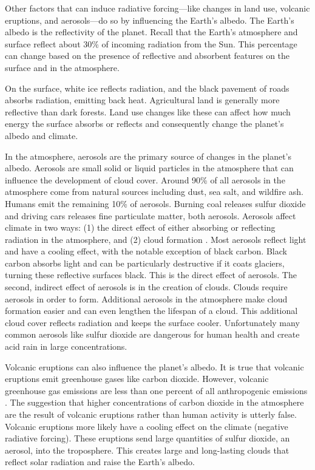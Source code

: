 Other factors that can induce radiative forcing---like changes in land use, volcanic eruptions, and aerosols---do so by influencing the Earth's albedo. The Earth's albedo is the reflectivity of the planet. Recall that the Earth's atmosphere and surface reflect about 30\% of incoming radiation from the Sun. This percentage can change based on the presence of reflective and absorbent features on the surface and in the atmosphere. 

On the surface, white ice reflects radiation, and the black pavement of roads absorbs radiation, emitting back heat. Agricultural land is generally more reflective than dark forests. Land use changes like these can affect how much energy the surface absorbs or reflects and consequently change the planet's albedo and climate. 

In the atmosphere, aerosols are the primary source of changes in the planet's albedo. Aerosols are small solid or liquid particles in the atmosphere that can influence the development of cloud cover. Around 90\% of all aerosols in the atmosphere come from natural sources including dust, sea salt, and  wildfire ash. Humans emit the remaining 10\% of aerosols. Burning coal releases sulfur dioxide and driving cars releases fine particulate matter, both aerosols. Aerosols affect climate in two ways: (1) the direct effect of either absorbing or reflecting radiation in the atmosphere, and (2) cloud formation \citep{gfdl}. Most aerosols reflect light and have a cooling effect, with the notable exception of black carbon. Black carbon absorbs light and can be particularly destructive if it coats glaciers, turning these reflective surfaces black. This is the direct effect of aerosols. The second, indirect effect of aerosols is in the creation of clouds. Clouds require aerosols in order to form. Additional aerosols in the atmosphere make cloud formation easier and can even lengthen the lifespan of a cloud. This additional cloud cover reflects radiation and keeps the surface cooler. Unfortunately many common aerosols like sulfur dioxide are dangerous for human health and create acid rain in large concentrations. 

Volcanic eruptions can also influence the planet's albedo. It is true that volcanic eruptions emit greenhouse gases like carbon dioxide. However, volcanic greenhouse gas emissions are less than one percent of all anthropogenic emissions \citep{usgs, gerlach2011volcanic}. The suggestion that higher concentrations of carbon dioxide in the atmosphere are the result of volcanic eruptions rather than human activity is utterly false. Volcanic eruptions more likely have a cooling effect on the climate (negative radiative forcing). These eruptions send large quantities of sulfur dioxide, an aerosol, into the troposphere. This creates large and long-lasting clouds that reflect solar radiation and raise the Earth's albedo. 

